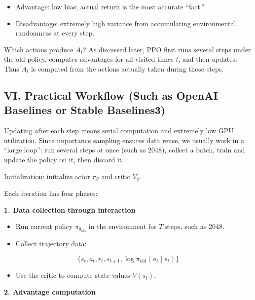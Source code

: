\begin{itemize}
\tightlist
\item
  Advantage: low bias; actual return is the most accurate ``fact.''
\item
  Disadvantage: extremely high variance from accumulating environmental randomness at every step.
\end{itemize}

Which actions produce \(A_t\)? As discussed later, PPO first runs several steps under the old policy, computes advantages for all visited times \(t\), and then updates. Thus \(A_t\) is computed from the actions actually taken during those steps.

\hypertarget{vi.-practical-workflow-such-as-openai-baselines-or-stable-baselines3}{%
\subsection{VI. Practical Workflow (Such as OpenAI Baselines or Stable Baselines3)}\label{vi.-practical-workflow-such-as-openai-baselines-or-stable-baselines3}}

Updating after each step means serial computation and extremely low GPU utilization. Since importance sampling ensures data reuse, we usually work in a ``large loop'': run several steps at once (such as 2048), collect a batch, train and update the policy on it, then discard it.

Initialization: initialize actor \(\pi_\theta\) and critic \(V_\phi\).

Each iteration has four phases:

\textbf{1. Data collection through interaction}

\begin{itemize}
\tightlist
\item
  Run current policy \(\pi_{\theta_{\mathrm{old}}}\) in the environment for \(T\) steps, such as 2048.
\item
{}
  Collect trajectory data:
\end{itemize}

\[
\{s_t,a_t,r_t,s_{t+1},\log\pi_{\mathrm{old}}(a_t\mid s_t)\}
\]

\begin{itemize}
\tightlist
\item
  Use the critic to compute state values \(V(s_t)\).
\end{itemize}

\textbf{2. Advantage computation}

